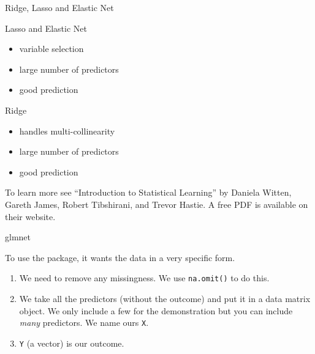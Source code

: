 \begin{frame}{Ridge, Lasso and Elastic Net}

\begin{block}{Lasso and Elastic Net}

\begin{itemize}
\tightlist
\item
  variable selection
\item
  large number of predictors
\item
  good prediction
\end{itemize}

\end{block}

\begin{block}{Ridge}

\begin{itemize}
\tightlist
\item
  handles multi-collinearity
\item
  large number of predictors
\item
  good prediction
\end{itemize}

To learn more see ``Introduction to Statistical Learning'' by Daniela
Witten, Gareth James, Robert Tibshirani, and Trevor Hastie. A free PDF
is available on their website.

\end{block}

\end{frame}

\begin{frame}[fragile]{glmnet}

To use the package, it wants the data in a very specific form.

\begin{enumerate}
\def\labelenumi{\arabic{enumi}.}
\tightlist
\item
  We need to remove any missingness. We use \texttt{na.omit()} to do
  this.
\item
  We take all the predictors (without the outcome) and put it in a data
  matrix object. We only include a few for the demonstration but you can
  include \emph{many} predictors. We name ours \texttt{X}.
\item
  \texttt{Y} (a vector) is our outcome.
\end{enumerate}

\end{frame}

